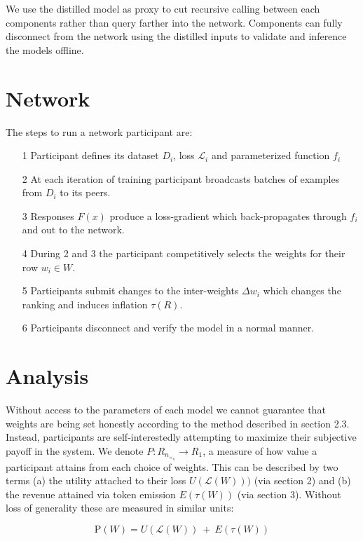 \documentclass{article}
\begin{document}
We use the distilled model as proxy to cut recursive calling between each components rather than query farther into the network. Components can fully disconnect from the network using the distilled inputs to validate and inference the models offline.
\smallskip

\section{Network}

The steps to run a network participant are:

\begin{itemize}

\item[1]  Participant defines its dataset $D_i$, loss $\mathcal{L}_i$ and parameterized function $f_i$
\item[2]  At each iteration of training participant broadcasts batches of examples from $D_i$ to its peers.
\item[3]  Responses $F(x)$ produce a loss-gradient which back-propagates through $f_i$ and out to the network.
\item[4]  During 2 and 3 the participant competitively selects the weights for their row $w_i \in W$.
\item[5]  Participants submit changes to the inter-weights $\Delta w_i$ which changes the ranking and induces inflation $\tau(R)$.
\item[6]  Participants disconnect and verify the model in a normal manner.
\end{itemize}


\section{Analysis}

Without access to the parameters of each model we cannot guarantee that weights are being set honestly according to the method described in section 2.3. Instead, participants are self-interestedly attempting to maximize their subjective payoff in the system. We denote $P: R_n_\times_n \rightarrow R_1$, a measure of how value a participant attains from each choice of weights. This can be described by two terms (a) the utility attached to their loss $U(\mathcal{L}(W)))$ (via section 2) and (b) the revenue attained via token emission $E(\tau(W))$ (via section 3). Without loss of generality these are measured in similar units:
\smallskip

\[ \textrm{P}(W) = U(\mathcal{L}(W)) \ + \ E(\tau(W)) \] 
\end{document}
